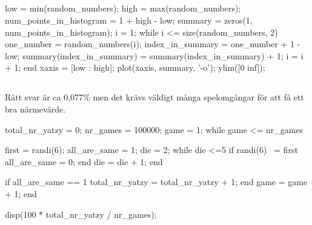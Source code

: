 \subsection*{}
\vspace{3pt}
\begin{matlab}
low = min(random_numbers);
high = max(random_numbers);
num_points_in_histogram = 1 + high - low;
summary = zeros(1, num_points_in_histogram);
i = 1;
while i <= size(random_numbers, 2)
	one_number = random_numbers(i);
	index_in_summary = one_number + 1 - low;
	summary(index_in_summary) = summary(index_in_summary) + 1;
	i = i + 1;
end
xaxis = [low : high];
plot(xaxis, summary, '-o');
ylim([0 inf]);
\end{matlab}

\subsection*{}
Rätt svar är ca 0,077\% men det krävs väldigt många spelomgångar för att få ett bra närmevärde.
\vspace{10pt}
\begin{matlab}
total_nr_yatzy = 0; %
nr_games = 100000; %
game = 1;
while game <= nr_games

  first = randi(6);
  all_are_same = 1;
  die = 2; %
  while die <=5
    if randi(6) ~= first
      all_are_same = 0;
    end
    die = die + 1; %
  end

  if all_are_same == 1 %
    total_nr_yatzy = total_nr_yatzy + 1;
  end
  game = game + 1; %
end

disp(100 * total_nr_yatzy / nr_games);
\end{matlab}

\subsection*{}

